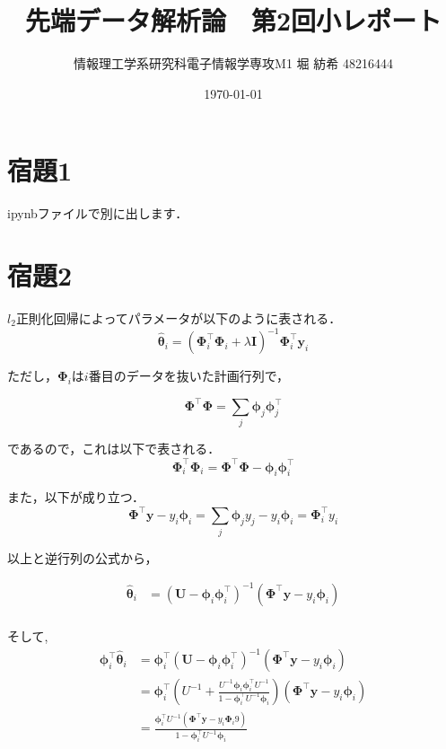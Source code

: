 \documentclass[a4paper,11pt]{jsarticle}
\begin{document}
  \title{先端データ解析論　第2回小レポート}
  \author{情報理工学系研究科電子情報学専攻M1 堀 紡希 48216444}
  \date{\today}
  \maketitle

  \section*{宿題1}
  ipynbファイルで別に出します．

  \section*{宿題2}
  $l_2$正則化回帰によってパラメータが以下のように表される．
  \begin{equation}
    \hat{\bm \theta}_i = ({\bm \Phi} ^\top _i
    {\bm \Phi }_i + \lambda {\bm I})^{-1} 
    {\bm \Phi }_i ^\top {\bm y}_i
  \end{equation}

  ただし，${\bm \Phi }_i$は$i$番目のデータを抜いた計画行列で，

  \[{\bm \Phi }^\top{\bm \Phi } = \sum _j {\bm \phi}_j{\bm \phi}_j^\top\]

  であるので，これは以下で表される．
  \[ {\bm \Phi} ^\top _i
  {\bm \Phi }_i = {\bm \Phi} ^\top 
  {\bm \Phi } - {\bm \phi}_i{\bm \phi}_i^\top  \]

  
  また，以下が成り立つ．
  \[{\bm \Phi }^\top {\bm y} -y_i \bm{\phi}_i = \sum _j {\bm \phi_j y_j} -y_i \bm{\phi}_i = {\bm \Phi}_i^\top y_i \]

  以上と逆行列の公式から，

  \begin{align*}
    \hat{\bm \theta}_i &= ({\bm U} - {\bm \phi}_i{\bm \phi}_i^\top)^{-1} ({\bm \Phi}^\top{\bm y} - y_i {\bm \phi}_i )\\
  \end{align*}

  そして, 
  \begin{align*}
    {\bm \phi}_i^\top\hat{\bm \theta}_i &= {\bm \phi}_i^\top({\bm U} - {\bm \phi}_i{\bm \phi}_i^\top)^{-1} ({\bm \Phi}^\top{\bm y} - y_i {\bm \phi}_i )\\
    &= {\bm \phi}_i^\top \left( U^{-1} + \frac{U^{-1} {\bm \phi}_i {\bm \phi}_i ^\top U^{-1}}{1-{\bm \phi}_i ^\top U ^{-1} {\bm \phi}_i} \right)({\bm \Phi}^\top{\bm y} - y_i {\bm \phi}_i )\\
    &= \frac{{\bm \phi}_i ^\top U^{-1}({\bm \Phi}^\top {\bm y} - y_i {\bm \Phi}_i9)}{1-{\bm \phi}_i ^\top U ^{-1} {\bm \phi}_i}
  \end{align*}
\end{document}
